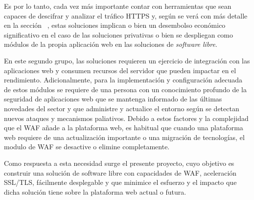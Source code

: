 \par Es por lo tanto, cada vez más importante contar con herramientas que sean capaces de descifrar y analizar el tráfico HTTPS y, según se verá con más detalle
en la sección ~, estas soluciones implican o bien un desembolso económico significativo en el caso de las soluciones privativas o
bien se despliegan como módulos de la propia aplicación web en las soluciones de {\em software libre\cite{softwarelibre}}.
\par En este segundo grupo, las soluciones requieren un ejercicio de integración con las aplicaciones web y consumen recursos del servidor que pueden impactar
en el rendimiento. Adicionalmente, para la implementación y configuración adecuada de estos módulos se requiere de una persona con un conocimiento profundo de
la seguridad de aplicaciones web que se mantenga informado de las últimas novedades del sector y que administre y actualice el entorno según se detectan nuevos
ataques y mecanismos paliativos.  Debido a estos factores y la complejidad que el WAF añade a la plataforma web, es habitual que cuando una plataforma web
requiere de una actualización importante o una migración de tecnologías, el modulo de WAF se desactive o elimine completamente.

\par Como respuesta a esta necesidad surge el presente proyecto, cuyo objetivo es construir una solución de software libre con capacidades de WAF, aceleración
SSL/TLS, fácilmente desplegable y que minimice el esfuerzo y el impacto que dicha solución tiene sobre la plataforma web actual o futura.
